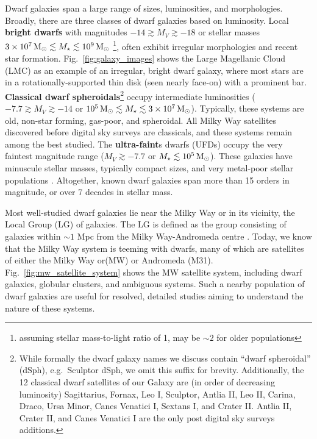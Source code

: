 Dwarf galaxies span a large range of sizes, luminosities, and
morphologies. Broadly, there are three classes of dwarf galaxies based
on luminosity. Local \textbf{bright dwarfs} with magnitudes
\(-14 \gtrsim M_V \gtrsim  -18\) or stellar masses
\(3\times10^7\,{\rm M}_{\odot} \lesssim M_\star \lesssim 10^9\,{\rm M}_{\odot}\) \footnote{assuming
  stellar mass-to-light ratio of 1, may be \(\sim 2\) for older
  populations}, often exhibit irregular morphologies and recent star
formation. Fig.~\ref{fig:galaxy_images} shows the Large Magellanic Cloud
(LMC) as an example of an irregular, bright dwarf galaxy, where most
stars are in a rotationally-supported thin disk (seen nearly face-on)
with a prominent bar. \textbf{Classical dwarf spheroidals}\footnote{While
  formally the dwarf galaxy names we discuss contain ``dwarf
  spheroidal'' (dSph), e.g.~Sculptor dSph, we omit this suffix for
  brevity. Additionally, the 12 classical dwarf satellites of our Galaxy
  are (in order of decreasing luminosity) Sagittarius, Fornax, Leo I,
  Sculptor, Antlia II, Leo II, Carina, Draco, Ursa Minor, Canes Venatici
  I, Sextans I, and Crater II. Antlia II, Crater II, and Canes Venatici
  I are the only post digital sky surveys additions.} occupy
intermediate luminosities ( \(-7.7 \gtrsim M_V  \gtrsim -14\) or
\(10^5\,{\rm M}_{\odot} \lesssim M_\star \lesssim 3\times10^7\,{\rm M}_{\odot}\)). Typically,
these systems are old, non-star forming, gas-poor, and spheroidal. All
Milky Way satellites discovered before digital sky surveys are
classicals, and these systems remain among the best studied. The
\textbf{ultra-faint}s dwarfs (UFDs) occupy the very faintest magnitude
range (\(M_V \gtrsim -7.7\) or \(M_\star \lesssim 10^5\,{\rm M}_{\odot}\)). These
galaxies have minuscule stellar masses, typically compact sizes, and
very metal-poor stellar populations \citep[see review][]{simon2019}.
Altogether, known dwarf galaxies span more than 15 orders in magnitude,
or over 7 decades in stellar mass.

Most well-studied dwarf galaxies lie near the Milky Way or in its
vicinity, the Local Group (LG) of galaxies. The LG is defined as the
group consisting of galaxies within \(\sim 1\) Mpc from the Milky
Way-Andromeda centre \citep[e.g.,][ and references
therein]{mcconnachie2012}. Today, we know that the Milky Way system is
teeming with dwarfs, many of which are satellites of either the Milky
Way or(MW) or Andromeda (M31). Fig.~\ref{fig:mw_satellite_system} shows
the MW satellite system, including dwarf galaxies, globular clusters,
and ambiguous systems. Such a nearby population of dwarf galaxies are
useful for resolved, detailed studies aiming to understand the nature of
these systems.

